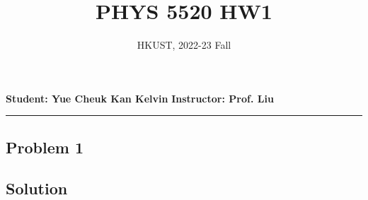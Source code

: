 \documentclass[a4paper, 12pt]{article}
\title{\textbf{PHYS 5520 HW1}}
\author{HKUST, 2022-23 Fall}
\date{\vspace{-5ex}}
\begin{document}
\maketitle

\begin{center}
\textbf{Student: Yue Cheuk Kan Kelvin}
\hfill
\textbf{Instructor: Prof. Liu} 
\rule{16.5cm}{1pt}
\end{center}

\subsection*{Problem 1}
\subsection*{Solution}
\begin{mdframed}
\end{mdframed}
\end{document}
